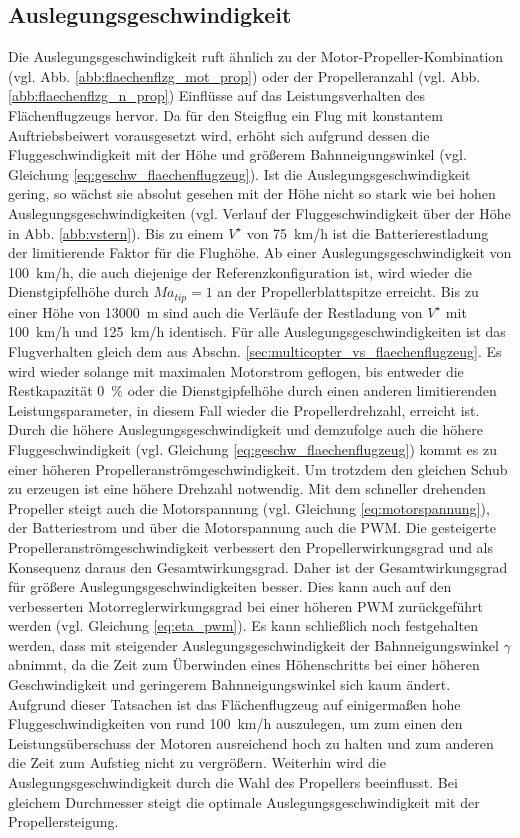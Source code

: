 \subsection{Auslegungsgeschwindigkeit}
\label{subsec:vstern}
Die Auslegungsgeschwindigkeit ruft ähnlich zu der Motor-Propeller-Kombination (vgl. Abb. \ref{abb:flaechenflzg_mot_prop}) oder der Propelleranzahl (vgl. Abb. \ref{abb:flaechenflzg_n_prop}) Einflüsse auf das Leistungsverhalten des Flächenflugzeugs hervor. Da für den Steigflug ein Flug mit konstantem Auftriebsbeiwert vorausgesetzt wird, erhöht sich aufgrund dessen die Fluggeschwindigkeit mit der Höhe und größerem Bahnneigungswinkel (vgl. Gleichung \eqref{eq:geschw_flaechenflugzeug}).
Ist die Auslegungsgeschwindigkeit gering, so wächst sie absolut gesehen mit der Höhe nicht so stark wie bei hohen Auslegungsgeschwindigkeiten (vgl. Verlauf der Fluggeschwindigkeit über der Höhe in Abb. \ref{abb:vstern}). 
Bis zu einem \ensuremath{V^\star} von \SI{75}{km/h} ist die Batterierestladung der limitierende Faktor für die Flughöhe. Ab einer Auslegungsgeschwindigkeit von \SI{100}{km/h}, die auch diejenige der Referenzkonfiguration ist, wird wieder die Dienstgipfelhöhe durch \ensuremath{Ma_{tip} = 1} an der Propellerblattspitze erreicht. Bis zu einer Höhe von \SI{13000}{m} sind auch die Verläufe der Restladung von \ensuremath{V^\star} mit \SI{100}{km/h} und \SI{125}{km/h} identisch. Für alle Auslegungsgeschwindigkeiten ist das Flugverhalten gleich dem aus Abschn. \ref{sec:multicopter_vs_flaechenflugzeug}. Es wird wieder solange mit maximalen Motorstrom geflogen, bis entweder die Restkapazität \SI{0}{\%} oder die Dienstgipfelhöhe durch einen anderen limitierenden Leistungsparameter, in diesem Fall wieder die Propellerdrehzahl, erreicht ist. Durch die höhere Auslegungsgeschwindigkeit und demzufolge auch die höhere Fluggeschwindigkeit (vgl. Gleichung \eqref{eq:geschw_flaechenflugzeug}) kommt es zu einer höheren Propelleranströmgeschwindigkeit. Um trotzdem den gleichen Schub zu erzeugen ist eine höhere Drehzahl notwendig. Mit dem schneller drehenden Propeller steigt auch die Motorspannung (vgl. Gleichung \eqref{eq:motorspannung}), der Batteriestrom und über die Motorspannung auch die PWM. Die gesteigerte Propelleranströmgeschwindigkeit verbessert den Propellerwirkungsgrad und als Konsequenz daraus den Gesamtwirkungsgrad. Daher ist der Gesamtwirkungsgrad für größere Auslegungsgeschwindigkeiten besser. Dies kann auch auf den verbesserten Motorreglerwirkungsgrad bei einer höheren PWM zurückgeführt werden (vgl. Gleichung \eqref{eq:eta_pwm}). Es kann schließlich noch festgehalten werden, dass mit steigender Auslegungsgeschwindigkeit der Bahnneigungswinkel \ensuremath{\gamma} abnimmt, da die Zeit zum Überwinden eines Höhenschritts bei einer höheren Geschwindigkeit und geringerem Bahnneigungswinkel sich kaum ändert. \\
Aufgrund dieser Tatsachen ist das Flächenflugzeug auf einigermaßen hohe Fluggeschwindigkeiten von rund \SI{100}{km/h} auszulegen, um zum einen den Leistungsüberschuss der Motoren ausreichend hoch zu halten und zum anderen die Zeit zum Aufstieg nicht zu vergrößern. Weiterhin wird die Auslegungsgeschwindigkeit durch die Wahl des Propellers beeinflusst. Bei gleichem Durchmesser steigt die optimale Auslegungsgeschwindigkeit mit der Propellersteigung.


